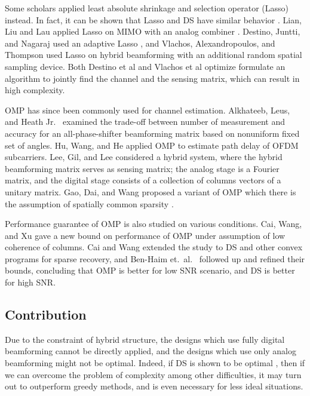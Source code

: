 \documentclass[journal]{IEEEtran}
\newcounter {result}
\begin{document}
Some scholars applied least absolute shrinkage and selection operator (Lasso) instead.
In fact, it can be shown that Lasso and DS have similar behavior \cite {AsR10}.
Lian, Liu and Lau applied Lasso on MIMO with an analog combiner \cite {LLL17}.
Destino, Juntti, and Nagaraj used an adaptive Lasso \cite {DJN15}, and Vlachos, Alexandropoulos, and Thompson \cite {VAT19} used Lasso on hybrid beamforming with an additional random spatial sampling device.
Both Destino et al and Vlachos et al optimize formulate an algorithm to jointly find the channel and the sensing matrix, which can result in high complexity.


OMP has since been commonly used for channel estimation.
Alkhateeb, Leus, and Heath Jr.\ \cite {ALH15} examined the trade-off between number of measurement and accuracy for an all-phase-shifter beamforming matrix based on nonuniform fixed set of angles.
Hu, Wang, and He \cite {HWH13} applied OMP to estimate path delay of OFDM subcarriers.
Lee, Gil, and Lee \cite {LGL16} considered a hybrid system, where the hybrid beamforming matrix serves as sensing matrix;
the analog stage is a Fourier matrix, and the digital stage consists of a collection of columns vectors of a unitary matrix.
Gao, Dai, and Wang proposed a variant of OMP which there is the assumption of spatially common sparsity \cite {GDW15}.

Performance guarantee of OMP is also studied on various conditions.
Cai, Wang, and Xu \cite {CWX10} gave a new bound on performance of OMP under assumption of low coherence of columns.
Cai and Wang \cite {CaW11} extended the study to DS and other convex programs for sparse recovery, and Ben-Haim et.\ al.\ \cite {BEE10} followed up and refined their bounds, concluding that OMP is better for low SNR scenario, and DS is better for high SNR.

\subsection {Contribution}

Due to the constraint of hybrid structure, the designs which use fully digital beamforming cannot be directly applied, and the designs which use only analog beamforming might not be optimal.
Indeed, if DS is shown to be optimal \cite {CaT07}, then if we can overcome the problem of complexity among other difficulties, it may turn out to outperform greedy methods, and is even necessary for less ideal situations.
\end{document}

